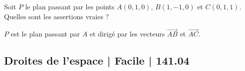 \begin{question} 
Soit $P$ le plan passant par les points $A(0,1,0)$, $B(1,-1,0)$ et $C(0,1,1)$. Quelles sont les assertions vraies ?
\begin{answers}


 
    
    
     
   
\end{answers}
\begin{explanations}
$P$ est le plan passant par $A$ et dirigé par les vecteurs $\overrightarrow{AB}$ et $\overrightarrow{AC}$.
\end{explanations}

\end{question}

\subsection{Droites de l'espace | Facile | 141.04}


